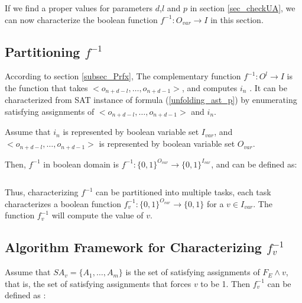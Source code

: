 \documentclass[journal]{IEEEtran}
\begin{document}
If we find a proper values for parameters $d$,$l$ and $p$ in section \ref{sec_checkUA},
we can now characterize the boolean function $f^{-1}:O_{var}\to I$ in this section.

\subsection{Partitioning $f^{-1}$}

According to section \ref{subsec_Prfx},
The complementary function $f^{-1}:O^l\to I$ is the function that takes $<o_{n+d-l},\dots , o_{n+d-1} >$,
and computes $i_n$ .
It can be characterized from SAT instance of formula (\ref{unfolding_ast_p})
by enumerating satisfying assignments of $<o_{n+d-l},\dots , o_{n+d-1} >$ and $i_n$.

Assume that $i_n$ is represented by boolean variable set $I_{var}$,
and $<o_{n+d-l},\dots , o_{n+d-1} >$ is represented by boolean variable set $O_{var}$.

Then,
$f^{-1}$ in boolean domain is $f^{-1}:\{0,1\}^{O_{var}}\to \{0,1\}^{I_{var}}$,
and can be defined as:

\begin{equation}
\end{equation}

Thus,
characterizing $f^{-1}$ can be partitioned into multiple tasks,
each task characterizes a boolean function $f^{-1}_v: \{0,1\}^{O_{var}}\to \{0,1\}$ for a $v\in I_{var}$.
The function $f^{-1}_v$ will compute the value of $v$.

\subsection{Algorithm Framework for Characterizing $f^{-1}_v$}
%
Assume that $SA_v=\{A_1,\dots,A_m\}$ is the set of satisfying assignments of $F_E\wedge v$,
that is,
the set of satisfying assignments that forces $v$ to be 1.
Then $f^{-1}_v$ can be defined as :
\end{document}
